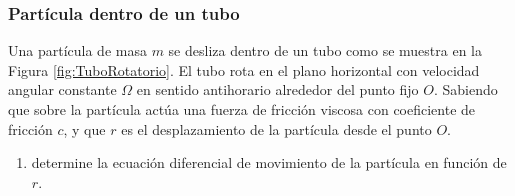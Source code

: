 \subsubsection{Partícula dentro de un tubo}

Una partícula de masa $m$ se desliza dentro de un tubo como se muestra en la Figura \ref{fig:TuboRotatorio}. El tubo rota en el plano horizontal con velocidad angular constante $\Omega$ en sentido antihorario alrededor del punto fijo $O$. Sabiendo que sobre la partícula actúa una fuerza de fricción viscosa con coeficiente de fricción $c$, y que $r$ es el desplazamiento de la partícula desde el punto $O$.
\begin{enumerate}
    \item determine la ecuación diferencial de movimiento de la partícula en función de $r$.
\end{enumerate}

